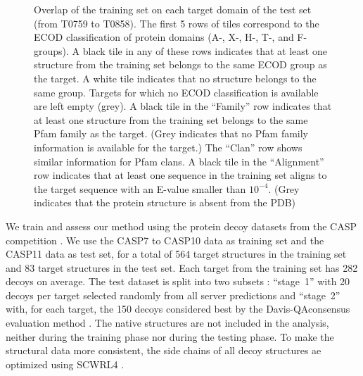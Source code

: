 \documentclass{bioinfo}
\begin{document}
\begin{figure}[t]
    \vspace{-10pt}
    \caption{Overlap of the training set on each target domain of the
    test set (from T0759 to T0858). The first 5 rows of tiles
    correspond to the ECOD classification of protein domains (A-, X-,
    H-, T-, and F-groups). A black tile in any of these rows indicates
    that at least one structure from the training set belongs to the
    same ECOD group as the target. A white tile indicates that no
    structure belongs to the same group. Targets for which no ECOD
    classification is available are left empty (grey).
    A black tile in the ``Family'' row indicates that at least one
    structure from the training set belongs to the same Pfam family as
    the target. (Grey indicates that no Pfam family information is
    available for the target.) The ``Clan'' row shows similar
    information for Pfam clans. A black tile in the ``Alignment'' row
    indicates that at least one sequence in the training set aligns to
    the target sequence with an E-value smaller than $10^{-4}$. (Grey
    indicates that the protein structure is absent from the PDB)}
    \label{Fig:summaryTable}
\end{figure}

We train and assess our method using the protein decoy datasets from
the CASP competition \citep{moult2014critical}.  We use the CASP7 to
CASP10 data as training set and the CASP11 data as test set, for a
total of 564 target structures in the training set and 83 target
structures in the test set. Each target from the training set has 282
decoys on average.
The test dataset is split into two subsets \citep{kryshtafovych2015}:
``stage~1'' with 20 decoys per target selected randomly from all
server predictions and ``stage~2'' with, for each target, the 150 decoys
considered best by the Davis-QAconsensus evaluation
method \citep{kryshtafovych2015}.
The native structures are not included in the analysis, neither
during the training phase nor during the testing phase. To make the
structural data more consistent, the side chains of all decoy
structures ae optimized using SCWRL4
\citep{krivov2009improved}.
\end{document}
